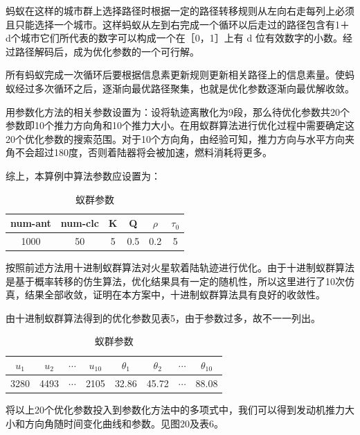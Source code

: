 \documentclass[UTF8,12pt]{ctexart}
\begin{document}
蚂蚁在这样的城市群上选择路径时根据一定的路径转移规则从左向右走每列上必须且只能选择一个城市。这样蚂蚁从左到右完成一个循环以后走过的路径包含有1＋d个城市它们所代表的数字可以构成一个在［0，1］上有 d 位有效数字的小数。经过路径解码后，成为优化参数的一个可行解。

所有蚂蚁完成一次循环后要根据信息素更新规则更新相关路径上的信息素量。使蚂蚁经过多次循环之后，逐渐向最优路径聚集，也就是优化参数逐渐向最优解收敛。

用参数化方法的相关参数设置为：设将轨迹离散化为9段，那么待优化参数共20个参数即10个推力方向角和10个推力大小。在用蚁群算法进行优化过程中需要确定这20个优化参数的搜索范围。对于10个方向角，由经验可知，推力方向与水平方向夹角不会超过180度，否则着陆器将会被加速，燃料消耗将更多。

综上，本算例中算法参数应设置为：

\begin{table}[ht]
	\centering
	\begin{tabular}{cccccc}  
		\toprule   
		\heiti num-ant&\heiti num-clc&\heiti K&\heiti Q&\heiti $\rho$&$\tau_0$\\  
		\midrule   
		1000&50&5&0.5&0.2&5\\
		\bottomrule  
	\end{tabular}
	\caption{蚁群参数}
\end{table}

按照前述方法用十进制蚁群算法对火星软着陆轨迹进行优化。由于十进制蚁群算法是基于概率转移的仿生算法，优化结果具有一定的随机性，所以这里进行了10次仿真，结果全部收敛，证明在本方案中，十进制蚁群算法具有良好的收敛性。

由十进制蚁群算法得到的优化参数见表5，由于参数过多，故不一一列出。

\begin{table}[ht]
	\centering
	\begin{tabular}{cccccccc}  
		\toprule   
		\heiti $u_1$&\heiti $u_2$&\heiti $\cdots$&\heiti $u_{10}$&\heiti $\theta_1$&\heiti $\theta_2$&\heiti $\cdots$&\heiti $\theta_{10}$\\  
		\midrule   
		3280&4493&$\cdots$&2105&32.86&45.72&$\cdots$&88.08\\
		\bottomrule  
	\end{tabular}
	\caption{蚁群参数}
\end{table}

将以上20个优化参数投入到参数化方法中的多项式中，我们可以得到发动机推力大小和方向角随时间变化曲线和参数。见图20及表6。
\end{document}
